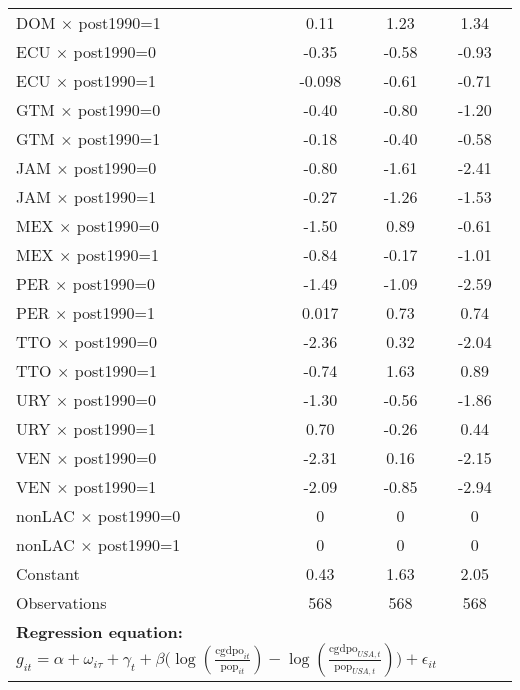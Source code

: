 \begin{table}[htbp]
\begin{tabular}{l*{3}{c}}
DOM $\times$ post1990=1&     0.11         &     1.23\sym{***}&     1.34\sym{***}\\
ECU $\times$ post1990=0&    -0.35\sym{*}  &    -0.58\sym{***}&    -0.93\sym{***}\\
ECU $\times$ post1990=1&   -0.098         &    -0.61\sym{***}&    -0.71\sym{***}\\
GTM $\times$ post1990=0&    -0.40\sym{**} &    -0.80\sym{***}&    -1.20\sym{***}\\
GTM $\times$ post1990=1&    -0.18         &    -0.40\sym{*}  &    -0.58\sym{**} \\
JAM $\times$ post1990=0&    -0.80\sym{***}&    -1.61\sym{***}&    -2.41\sym{***}\\
JAM $\times$ post1990=1&    -0.27\sym{*}  &    -1.26\sym{***}&    -1.53\sym{***}\\
MEX $\times$ post1990=0&    -1.50\sym{***}&     0.89\sym{***}&    -0.61\sym{**} \\
MEX $\times$ post1990=1&    -0.84\sym{***}&    -0.17         &    -1.01\sym{***}\\
PER $\times$ post1990=0&    -1.49\sym{***}&    -1.09\sym{***}&    -2.59\sym{***}\\
PER $\times$ post1990=1&    0.017         &     0.73\sym{***}&     0.74\sym{***}\\
TTO $\times$ post1990=0&    -2.36\sym{***}&     0.32         &    -2.04\sym{***}\\
TTO $\times$ post1990=1&    -0.74\sym{***}&     1.63\sym{***}&     0.89\sym{***}\\
URY $\times$ post1990=0&    -1.30\sym{***}&    -0.56\sym{***}&    -1.86\sym{***}\\
URY $\times$ post1990=1&     0.70\sym{***}&    -0.26\sym{*}  &     0.44\sym{**} \\
VEN $\times$ post1990=0&    -2.31\sym{***}&     0.16         &    -2.15\sym{***}\\
VEN $\times$ post1990=1&    -2.09\sym{***}&    -0.85\sym{***}&    -2.94\sym{***}\\
nonLAC $\times$ post1990=0&        0         &        0         &        0         \\
nonLAC $\times$ post1990=1&        0         &        0         &        0         \\
Constant        &     0.43\sym{**} &     1.63\sym{***}&     2.05\sym{***}\\
\midrule
Observations    &      568         &      568         &      568         \\
\bottomrule
\multicolumn{4}{l}{\footnotesize \textbf{Regression equation:} \(g_{it} = \alpha + \omega_{i\tau} + \gamma_t + \beta \big(\log (\frac{\textrm{cgdpo}_{it}}{\textrm{pop}_{it}} ) - \log (\frac{\textrm{cgdpo}_{USA,t}}{\textrm{pop}_{USA,t}}  ) \big) + \epsilon_{it}\)}\\

\end{tabular}
\end{table}
